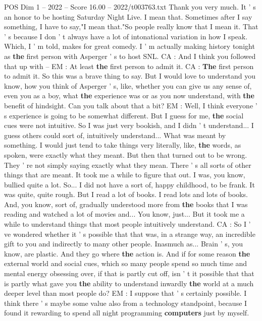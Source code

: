 \begin{textsample}{POS Dim 1 – 2022 – Score 16.00 – 2022/t003763.txt}
Thank you very much.
It ' s an honor to be hosting Saturday Night Live.
I mean that.
Sometimes after I say something, I have to say,"I mean that."So people really know that I mean it.
That ' s because I don ' t always have a lot of intonational variation in how I speak.
Which, I ' m told, makes for great comedy.
I ' m actually making history tonight as \textbf{the} first person with Asperger ' s to host SNL.
CA : And I think you followed that up with -- EM : At least \textbf{the} first person to admit it.
CA : \textbf{The} first person to admit it.
So this was a brave thing to say.
But I would love to understand you know, how you think of Asperger ' s, like, whether you can give us any sense of, even you as a boy, what \textbf{the} experience was or as you now understand, with \textbf{the} benefit of hindsight.
Can you talk about that a bit?
EM : Well, I think everyone ' s experience is going to be somewhat different.
But I guess for me, \textbf{the} social cues were not intuitive.
So I was just very bookish, and I didn ' t understand...
I guess others could sort of, intuitively understand...
What was meant by something.
I would just tend to take things very literally, like, \textbf{the} words, as spoken, were exactly what they meant.
But then that turned out to be wrong.
They ' re not simply saying exactly what they mean.
There ' s all sorts of other things that are meant.
It took me a while to figure that out.
I was, you know, bullied quite a lot.
So...
I did not have a sort of, happy childhood, to be frank.
It was quite, quite rough.
But I read a lot of books.
I read lots and lots of books.
And, you know, sort of, gradually understood more from \textbf{the} books that I was reading and watched a lot of movies and...
You know, just...
But it took me a while to understand things that most people intuitively understand.
CA : So I ' ve wondered whether it ' s possible that that was, in a strange way, an incredible gift to you and indirectly to many other people.
Inasmuch as...
Brain ' s, you know, are plastic.
And they go where \textbf{the} action is.
And if for some reason \textbf{the} external world and social cues, which so many people spend so much time and mental energy obsessing over, if that is partly cut off, isn ' t it possible that that is partly what gave you \textbf{the} ability to understand inwardly \textbf{the} world at a much deeper level than most people do?
EM : I suppose that ' s certainly possible.
I think there ' s maybe some value also from a technology standpoint, because I found it rewarding to spend all night programming \textbf{computers} just by myself.

\end{textsample}

